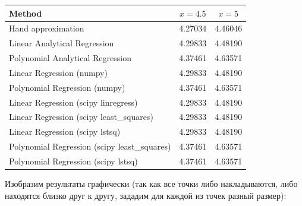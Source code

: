 \documentclass[a4paper, 14pt]{extarticle}
\begin{document}
\begin{table}[h!]
    \centering
    \renewcommand{\arraystretch}{1.5} %
    \begin{tabular}{lcc}
    \toprule
    \textbf{Method} & \textbf{\( x = 4.5 \)} & \textbf{\( x = 5 \)} \\
    \midrule
    Hand approximation & 4.27034 & 4.46046 \\
    Linear Analytical Regression & 4.29833 & 4.48190 \\
    Polynomial Analytical Regression & 4.37461 & 4.63571 \\
    Linear Regression (numpy) & 4.29833 & 4.48190 \\
    Polynomial Regression (numpy) & 4.37461 & 4.63571 \\
    Linear Regression (scipy linregress) & 4.29833 & 4.48190 \\
    Linear Regression (scipy least\_squares) & 4.29833 & 4.48190 \\
    Linear Regression (scipy lstsq) & 4.29833 & 4.48190 \\
    Polynomial Regression (scipy least\_squares) & 4.37461 & 4.63571 \\
    Polynomial Regression (scipy lstsq) & 4.37461 & 4.63571 \\
    \bottomrule
    \end{tabular}
\end{table}

Изобразим результаты графически (так как все точки либо накладываются, 
либо находятся близко друг к другу, зададим для каждой из точек разный размер):
\end{document}
